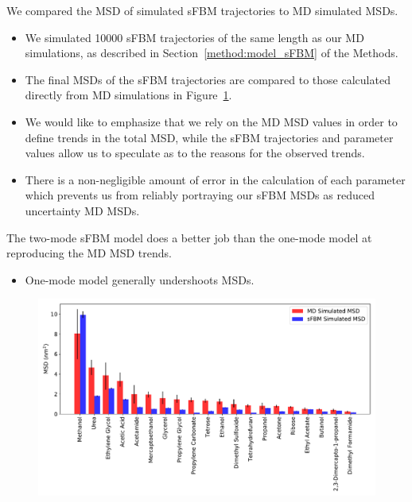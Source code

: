 \documentclass{article}
\begin{document}
  \noindent We compared the MSD of simulated sFBM trajectories to MD simulated
  MSDs.
  \begin{itemize}
	\item We simulated 10000 sFBM trajectories of the same length as our MD
	simulations, as described in Section~\ref{method:model_sFBM} of the Methods.
	\item The final MSDs of the sFBM trajectories are compared to those 
	calculated directly from MD simulations in Figure~\ref{fig:all_msds}. 
	\item We would like to emphasize that we rely on the MD MSD values in order to
	define trends in the total MSD, while the sFBM trajectories and parameter 
	values allow us to speculate as to the reasons for the observed trends. 
	\item There is a non-negligible amount of error in the calculation of 
	each parameter which prevents us from reliably portraying our sFBM MSDs as
	reduced	uncertainty MD MSDs.
  \end{itemize}
  
  The two-mode sFBM model does a better job than the one-mode model at 
  reproducing the MD MSD trends. 
  \begin{itemize}
    \item One-mode model generally undershoots MSDs.
  \end{itemize}

  \begin{figure}
  \centering
  \includegraphics[width=\textwidth]{all_emsds.pdf}
  \caption{}\label{fig:all_msds}
  \end{figure}
\end{document}
